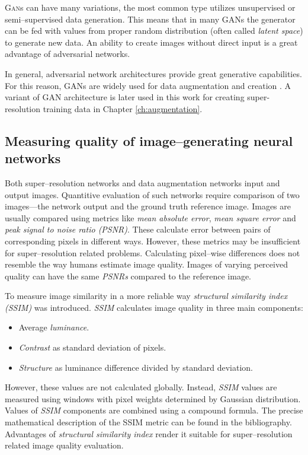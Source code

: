 \textsc{Gan}s can have many variations, the most common type utilizes unsupervised or semi--supervised data generation.
This means that in many GANs the generator can be fed with values from proper random distribution (often called \textit{latent space}) to generate new data.
An ability to create images without direct input is a great advantage of adversarial networks.

In general, adversarial network architectures provide great generative capabilities.
For this reason, GANs are widely used for data augmentation and creation \cite{bulat-2018-supergan, sundaram-2021-gangen, shorten-2019-augmentation, perez-2017-augmentation}.
A variant of GAN architecture is later used in this work for creating super-resolution training data in Chapter \ref{ch:augmentation}.

\subsection{Measuring quality of image--generating neural networks}

Both super--resolution networks and data augmentation networks input and output images.
Quantitive evaluation of such networks require comparison of two images---the network output and the ground truth reference image.
Images are usually compared using metrics like \textit{mean absolute error}, \textit{mean square error} and \textit{peak signal to noise ratio (PSNR)}.
These calculate error between pairs of corresponding pixels in different ways.
However, these metrics may be insufficient for super--resolution related problems.
Calculating pixel--wise differences does not resemble the way humans estimate image quality.
Images of varying perceived quality can have the same \textit{PSNRs} compared to the reference image.

To measure image similarity in a more reliable way \textit{structural similarity index (SSIM)} \cite{wang-2004-ssim} was introduced.
\textit{SSIM} calculates image quality in three main components:
\begin{itemize}
	\item Average \textit{luminance}.
	\item \textit{Contrast} as standard deviation of pixels.
	\item \textit{Structure} as luminance difference divided by standard deviation.
\end{itemize}
However, these values are not calculated globally.
Instead, \textit{SSIM} values are measured using windows with pixel weights determined by Gaussian distribution.
Values of \textit{SSIM} components are combined using a compound formula.
The precise mathematical description of the SSIM metric can be found in the bibliography.
Advantages of \textit{structural similarity index} render it suitable for super--resolution related image quality evaluation.

